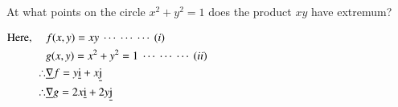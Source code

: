 \documentclass[12pt]{article}
\renewcommand{\vec}[1]{\underline{\mathrm{#1}}}
\begin{document}
\vspace{2ex}
\textbf{} At what points on the circle $x^2+y^2=1$ does the product $xy$ have extremum?

\vspace{2ex}

\begin{multicols}{2}
   \setlength{\columnseprule}{0pt}
   $\begin{aligned}
      \text{Here, } \quad
      & f(x,y) = xy \seteqno{i}\\
      & g(x,y) = x^2+y^2=1 \seteqno{ii}\\
      \therefore
      & \vec{\nabla}f=y\vec{i} + x\vec{j} \\
      \therefore 
      & \vec{\nabla}g=2x\vec{i} + 2y\vec{j}
   \end{aligned}$

   \columnbreak

\end{multicols}
\end{document}

